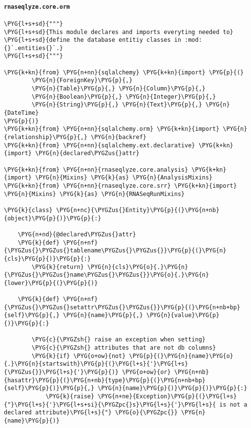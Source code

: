 \paragraph{\texttt{rnaseqlyze.core.orm}}
\label{index-pdf4:rnaseqlyze-core-orm}
\begin{Verbatim}[commandchars=\\\{\}]
\PYG{l+s+sd}{"""}
\PYG{l+s+sd}{This module declares and imports everyting needed to}
\PYG{l+s+sd}{define the database entitiy classes in :mod:{}`.entities{}`.}
\PYG{l+s+sd}{"""}

\PYG{k+kn}{from} \PYG{n+nn}{sqlalchemy} \PYG{k+kn}{import} \PYG{p}{(}
        \PYG{n}{ForeignKey}\PYG{p}{,}
        \PYG{n}{Table}\PYG{p}{,} \PYG{n}{Column}\PYG{p}{,}
        \PYG{n}{Boolean}\PYG{p}{,} \PYG{n}{Integer}\PYG{p}{,}
        \PYG{n}{String}\PYG{p}{,} \PYG{n}{Text}\PYG{p}{,} \PYG{n}{DateTime}
\PYG{p}{)}
\PYG{k+kn}{from} \PYG{n+nn}{sqlalchemy.orm} \PYG{k+kn}{import} \PYG{n}{relationship}\PYG{p}{,} \PYG{n}{backref}
\PYG{k+kn}{from} \PYG{n+nn}{sqlalchemy.ext.declarative} \PYG{k+kn}{import} \PYG{n}{declared\PYGZus{}attr}

\PYG{k+kn}{from} \PYG{n+nn}{rnaseqlyze.core.analysis} \PYG{k+kn}{import} \PYG{n}{Mixins} \PYG{k}{as} \PYG{n}{AnalysisMixins}
\PYG{k+kn}{from} \PYG{n+nn}{rnaseqlyze.core.srr} \PYG{k+kn}{import} \PYG{n}{Mixins} \PYG{k}{as} \PYG{n}{RNASeqRunMixins}

\PYG{k}{class} \PYG{n+nc}{\PYGZus{}Entity}\PYG{p}{(}\PYG{n+nb}{object}\PYG{p}{)}\PYG{p}{:}

    \PYG{n+nd}{@declared\PYGZus{}attr}
    \PYG{k}{def} \PYG{n+nf}{\PYGZus{}\PYGZus{}tablename\PYGZus{}\PYGZus{}}\PYG{p}{(}\PYG{n}{cls}\PYG{p}{)}\PYG{p}{:}
        \PYG{k}{return} \PYG{n}{cls}\PYG{o}{.}\PYG{n}{\PYGZus{}\PYGZus{}name\PYGZus{}\PYGZus{}}\PYG{o}{.}\PYG{n}{lower}\PYG{p}{(}\PYG{p}{)}

    \PYG{k}{def} \PYG{n+nf}{\PYGZus{}\PYGZus{}setattr\PYGZus{}\PYGZus{}}\PYG{p}{(}\PYG{n+nb+bp}{self}\PYG{p}{,} \PYG{n}{name}\PYG{p}{,} \PYG{n}{value}\PYG{p}{)}\PYG{p}{:}

        \PYG{c}{\PYGZsh{} raise an exception when setting}
        \PYG{c}{\PYGZsh{} attributes that are not db columns}
        \PYG{k}{if} \PYG{o+ow}{not} \PYG{p}{(}\PYG{n}{name}\PYG{o}{.}\PYG{n}{startswith}\PYG{p}{(}\PYG{l+s}{'}\PYG{l+s}{\PYGZus{}}\PYG{l+s}{'}\PYG{p}{)} \PYG{o+ow}{or} \PYG{n+nb}{hasattr}\PYG{p}{(}\PYG{n+nb}{type}\PYG{p}{(}\PYG{n+nb+bp}{self}\PYG{p}{)}\PYG{p}{,} \PYG{n}{name}\PYG{p}{)}\PYG{p}{)}\PYG{p}{:}
            \PYG{k}{raise} \PYG{n+ne}{Exception}\PYG{p}{(}\PYG{l+s}{"}\PYG{l+s}{'}\PYG{l+s+si}{\PYGZpc{}s}\PYG{l+s}{'}\PYG{l+s}{ is not a declared attribute}\PYG{l+s}{"} \PYG{o}{\PYGZpc{}} \PYG{n}{name}\PYG{p}{)}


\end{Verbatim}
